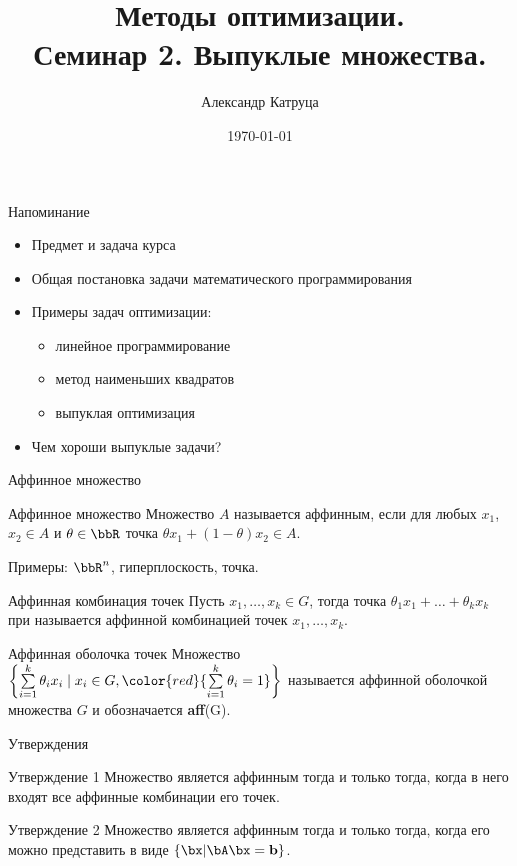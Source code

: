 \documentclass[12pt,russian]{beamer}
\title[Семинар 2]{Методы оптимизации. \\
Семинар 2. Выпуклые множества.}
\author{Александр Катруца}
\institute{Московский физико-технический институт,\\
Факультет Управления и Прикладной Математики}
\date{\today}
\begin{document}
\begin{frame}
\maketitle
\end{frame}

\begin{frame}{Напоминание}

\begin{itemize}
\item Предмет и задача курса
\item Общая постановка задачи математического программирования
\item Примеры задач оптимизации: 
\begin{itemize}
\item линейное программирование
\item метод наименьших квадратов
\item выпуклая оптимизация
\end{itemize}
\item Чем хороши выпуклые задачи?
\end{itemize}
\end{frame}

\begin{frame}{Аффинное множество}
\small
\begin{block}{Аффинное множество}
Множество $A$ называется аффинным, если для любых $x_1$, $x_2 \in A$ и $\theta \in \bbR$ точка $\theta x_1 + (1 - \theta)x_2 \in A$.
\end{block}
Примеры: $\bbR^n$, гиперплоскость, точка.
\begin{block}{Аффинная комбинация точек}
Пусть $x_1, \ldots, x_k \in G$, тогда точка $\theta_1 x_1 + \ldots + \theta_k x_k$ при {} называется аффинной комбинацией точек $x_1,\ldots,x_k$.
\end{block}

\begin{block}{Аффинная оболочка точек}
Множество $\left\{ \sum\limits_{i=1}^k \theta_i x_i \; | \; x_i \in G, {\color{red}{\sum\limits_{i=1}^k \theta_i = 1}} \right\}$ называется аффинной оболочкой множества $G$ и обозначается \textbf{aff}(G).
\end{block}
\end{frame}

\begin{frame}{Утверждения}

\begin{block}{Утверждение 1}
Множество является аффинным тогда и только тогда, когда в него входят все аффинные комбинации его точек.
\end{block}

\begin{block}{Утверждение 2}
Множество является аффинным тогда и только тогда, когда его можно представить в виде $\{\bx | \bA\bx = \mathbf{b} \}$.
\end{block}
\end{frame}
\end{document}
